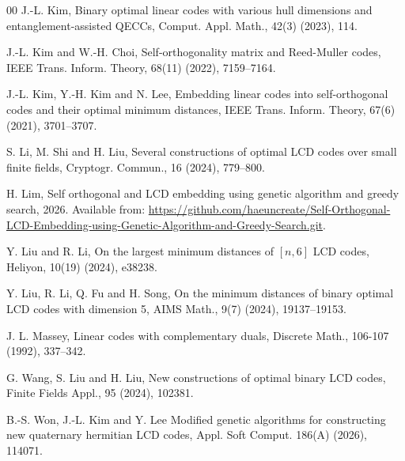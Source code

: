 \documentclass{article}
\theoremstyle{definition}
\theoremstyle{remark}
\begin{document}
\begin{thebibliography}{00}
\newblock J.-L. Kim,
\newblock Binary optimal linear codes with various hull dimensions and entanglement-assisted QECCs,
\newblock Comput. Appl. Math., 42(3) (2023), 114.

\newblock J.-L. Kim and W.-H. Choi,
\newblock Self-orthogonality matrix and Reed-Muller codes,
\newblock IEEE Trans. Inform. Theory, 68(11) (2022), 7159--7164.

\newblock J.-L. Kim, Y.-H. Kim and N. Lee,
\newblock Embedding linear codes into self-orthogonal codes and their optimal minimum distances,
\newblock IEEE Trans. Inform. Theory, 67(6) (2021), 3701--3707.

\newblock S. Li, M. Shi and H. Liu,
\newblock Several constructions of optimal LCD codes over small finite fields,
\newblock Cryptogr. Commun., 16 (2024), 779--800.

\newblock H. Lim,
\newblock Self orthogonal and LCD embedding using genetic algorithm and greedy search, 2026.
\newblock Available from: \url{https://github.com/haeuncreate/Self-Orthogonal-LCD-Embedding-using-Genetic-Algorithm-and-Greedy-Search.git}.

\newblock Y. Liu and R. Li,
\newblock On the largest minimum distances of $[n, 6]$ LCD codes,
\newblock Heliyon, 10(19) (2024), e38238.

\newblock Y. Liu, R. Li, Q. Fu and H. Song,
\newblock On the minimum distances of binary optimal LCD codes with dimension 5,
\newblock AIMS Math., 9(7) (2024), 19137--19153.

\newblock J. L. Massey,
\newblock Linear codes with complementary duals,
\newblock Discrete Math., 106-107 (1992), 337--342.

\newblock G. Wang, S. Liu and H. Liu,
\newblock New constructions of optimal binary LCD codes,
\newblock Finite Fields Appl., 95 (2024), 102381.

\newblock B.-S. Won, J.-L. Kim and Y. Lee
\newblock Modified genetic algorithms for constructing new quaternary hermitian LCD codes,
\newblock Appl. Soft Comput. 186(A) (2026), 114071.

\end{thebibliography}
\end{document}
